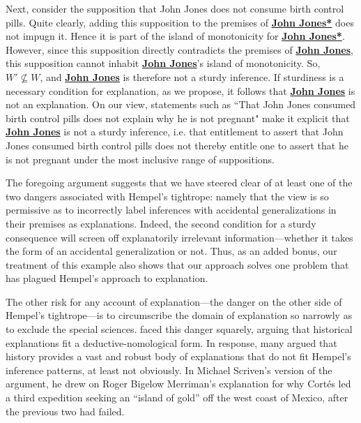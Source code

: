 \documentclass{article}                     %
\begin{document}
\noindent Next, consider the supposition that John Jones does not consume birth control pills. Quite clearly, adding this supposition to the premises of \hyperref[JohnJones*]{\textbf{John Jones*}} does not impugn it. Hence it is part of the island of monotonicity for \hyperref[JohnJones*]{\textbf{John Jones*}}. However, since this supposition directly contradicts the premises of \hyperref[JohnJones]{\textbf{John Jones}},  this supposition cannot inhabit \hyperref[JohnJones]{\textbf{John Jones}}'s island of monotonicity. So,  $ W'\not\subseteq W $, and \hyperref[JohnJones]{\textbf{John Jones}} is therefore not a sturdy inference. If sturdiness is a necessary condition for explanation, as we propose, it follows that \hyperref[JohnJones]{\textbf{John Jones}} is not an explanation. On our view, statements such as ``That John Jones consumed birth control pills does not explain why he is not pregnant" make it explicit that \hyperref[JohnJones]{\textbf{John Jones}} is not a sturdy inference, i.e. that entitlement to assert that John Jones consumed birth control pills does not thereby entitle one to assert that he is not pregnant under the most inclusive range of suppositions.

The foregoing argument suggests that we have steered clear of at least one of the two dangers associated with Hempel's tightrope: namely that the view is so permissive as to incorrectly label inferences with accidental generalizations in their premises as explanations. Indeed, the second condition for a sturdy consequence will screen off explanatorily irrelevant information---whether it takes the form of an accidental generalization or not. Thus, as an added bonus, our treatment of this example also shows that our approach solves one problem that has plagued Hempel's approach to explanation. 

The other risk for any account of explanation---the danger on the other side of Hempel's tightrope---is to circumscribe the domain of explanation so narrowly as to exclude the special sciences.  \cite{Hempel1942} faced this danger squarely,  arguing that historical explanations fit a deductive-nomological form.  In response, many argued that history provides a vast and robust body of explanations that do not fit Hempel's inference patterns, at least not obviously.  In Michael Scriven's \citeyearpar{Scriven1959a} version of the argument, he drew on Roger Bigelow Merriman's \citeyearpar{Merriman1918} explanation for why Cort\'{e}s led a third expedition seeking an ``island of gold'' off the west coast of Mexico, after the previous two had failed. 
\end{document}
